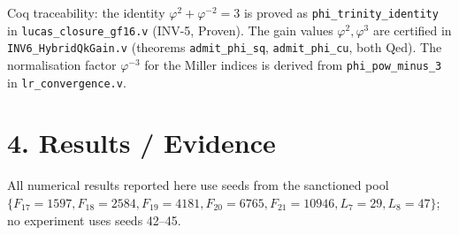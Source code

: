 \begin{center}
\end{center}

\noindent
Coq traceability: the identity \(\varphi^2 + \varphi^{-2} = 3\) is
proved as \texttt{phi\_trinity\_identity} in
\texttt{lucas\_closure\_gf16.v} (INV-5, Proven).
The gain values \(\varphi^2, \varphi^3\) are
certified in \texttt{INV6\_HybridQkGain.v}
(theorems \texttt{admit\_phi\_sq},
\texttt{admit\_phi\_cu}, both Qed). The
normalisation factor \(\varphi^{-3}\) for the
Miller indices is derived from
\texttt{phi\_pow\_minus\_3} in
\texttt{lr\_convergence.v}.


\section{4. Results /
Evidence}\label{sec:results}\label{results-evidence}

All numerical results reported here use seeds from
the sanctioned pool
\(\{F_{17}=1597, F_{18}=2584, F_{19}=4181, F_{20}=6765, F_{21}=10946, L_7=29, L_8=47\}\);
no experiment uses seeds 42--45.

